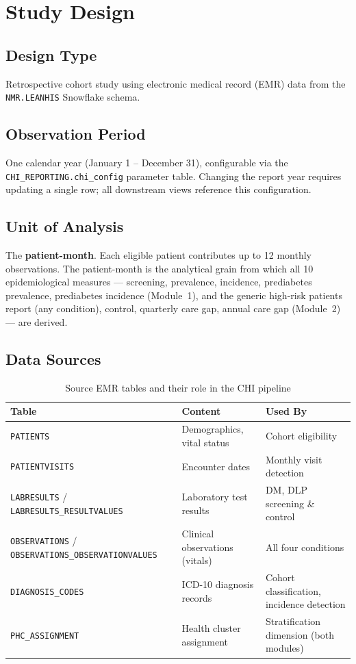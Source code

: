\documentclass[11pt,a4paper]{article}
\begin{document}
\section{Study Design}

\subsection{Design Type}
Retrospective cohort study using electronic medical record (EMR) data from the \texttt{NMR.LEANHIS} Snowflake schema.

\subsection{Observation Period}
One calendar year (January 1 -- December 31), configurable via the \texttt{CHI\_REPORTING.chi\_config} parameter table. Changing the report year requires updating a single row; all downstream views reference this configuration.

\subsection{Unit of Analysis}
The \textbf{patient-month}. Each eligible patient contributes up to 12 monthly observations. The patient-month is the analytical grain from which all 10 epidemiological measures --- screening, prevalence, incidence, prediabetes prevalence, prediabetes incidence (Module~1), and the generic high-risk patients report (any condition), control, quarterly care gap, annual care gap (Module~2) --- are derived.

\subsection{Data Sources}

\begin{table}[ht]
\centering\small
\caption{Source EMR tables and their role in the CHI pipeline}
\begin{tabular}{@{}p{} p{} p{}@{}}
\toprule
\textbf{Table} & \textbf{Content} & \textbf{Used By} \\
\midrule
\texttt{PATIENTS} & Demographics, vital status & Cohort eligibility \\
\texttt{PATIENTVISITS} & Encounter dates & Monthly visit detection \\
\texttt{LABRESULTS} / \texttt{LABRESULTS\_RESULTVALUES} & Laboratory test results & DM, DLP screening \& control \\
\texttt{OBSERVATIONS} / \texttt{OBSERVATIONS\_OBSERVATIONVALUES} & Clinical observations (vitals) & All four conditions \\
\texttt{DIAGNOSIS\_CODES} & ICD-10 diagnosis records & Cohort classification, incidence detection \\
\texttt{PHC\_ASSIGNMENT} & Health cluster assignment & Stratification dimension (both modules) \\
\bottomrule
\end{tabular}
\end{table}
\end{document}
